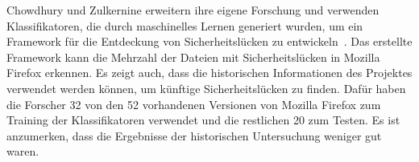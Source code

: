 Chowdhury und Zulkernine erweitern ihre eigene Forschung und verwenden Klassifikatoren, die durch maschinelles Lernen generiert wurden, um ein Framework für die Entdeckung von Sicherheitslücken zu entwickeln~\cite{chowdhury_zulkernine_2009,chowdhury_zulkernine_2010}.
Das erstellte Framework kann die Mehrzahl der Dateien mit Sicherheitslücken in Mozilla Firefox erkennen.
Es zeigt auch, dass die historischen Informationen des Projektes verwendet werden können, um künftige Sicherheitslücken zu finden.
Dafür haben die Forscher 32 von den 52 vorhandenen Versionen von Mozilla Firefox zum Training der Klassifikatoren verwendet und die restlichen 20 zum Testen.
Es ist anzumerken, dass die Ergebnisse der historischen Untersuchung weniger gut waren.
